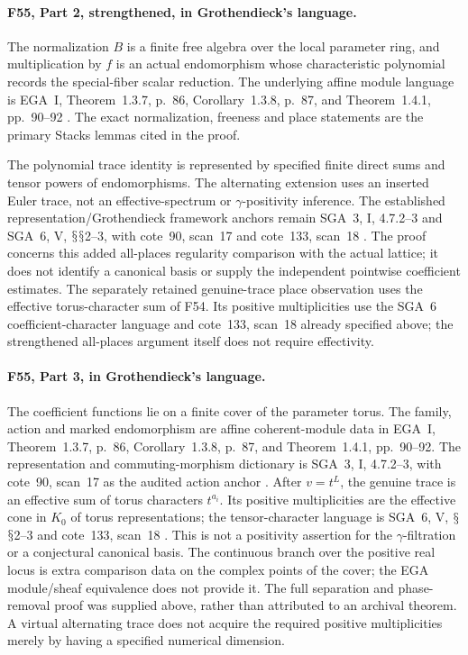 \documentclass[11pt,a4paper]{article}
\renewcommand{\S}{\ensuremath{\mathsection}}
\newcommand{\fid}[1]{\textsf{#1}}\newcommand{\gate}[1]{\textsf{#1}}
\theoremstyle{named}\newtheorem{finding}{Finding}[section]
\theoremstyle{definition}\newtheorem{definition}[finding]{Definition}
\theoremstyle{remark}\newtheorem{remark}[finding]{Remark}
\begin{document}
\paragraph{\fid{F55}, Part 2, strengthened, in Grothendieck's language.}
The normalization $B$ is a finite free algebra over
the local parameter ring, and multiplication by $f$
is an actual endomorphism whose characteristic
polynomial records the special-fiber scalar reduction.
The underlying affine module language is EGA~I,
Theorem~1.3.7, p.~86, Corollary~1.3.8, p.~87,
and Theorem~1.4.1, pp.~90--92 \cite{EGA}.
The exact normalization, freeness and place statements
are the primary Stacks lemmas cited in the proof.

The polynomial trace identity is represented by
specified finite direct sums and tensor powers
of endomorphisms. The alternating extension uses
an inserted Euler trace, not an effective-spectrum
or $\gamma$-positivity inference.
The established representation/Grothendieck framework
anchors remain SGA~3, I, 4.7.2--3 and
SGA~6, V, \S\S2--3, with cote~90, scan~17 and
cote~133, scan~18 \cite{SGA3,SGA6,Archive}.
The proof concerns this added all-places regularity
comparison with the actual lattice; it does not
identify a canonical basis or supply the independent
pointwise coefficient estimates.
The separately retained genuine-trace place observation uses the effective torus-character sum of F54. Its positive multiplicities use the SGA~6 coefficient-character language and cote~133, scan~18 already specified above; the strengthened all-places argument itself does not require effectivity.

\paragraph{\fid{F55}, Part 3, in Grothendieck's language.}
The coefficient functions lie on a finite cover of the
parameter torus. The family, action and marked
endomorphism are affine coherent-module data in
EGA~I, Theorem~1.3.7, p.~86, Corollary~1.3.8, p.~87,
and Theorem~1.4.1, pp.~90--92.
The representation and commuting-morphism dictionary
is SGA~3, I, 4.7.2--3, with cote~90, scan~17 as the
audited action anchor \cite{EGA,SGA3,Archive}.
After $v=t^L$, the genuine trace is an effective sum
of torus characters $t^{a_i}$.
Its positive multiplicities are the effective cone in
$K_0$ of torus representations; the tensor-character
language is SGA~6, V, \S\S2--3 and cote~133, scan~18
\cite{SGA6,Archive}.
This is not a positivity assertion for the
$\gamma$-filtration or a conjectural canonical basis.
The continuous branch over the positive real locus
is extra comparison data on the complex points of
the cover; the EGA module/sheaf equivalence does not
provide it. The full separation and phase-removal
proof was supplied above, rather than attributed to
an archival theorem. A virtual alternating trace
does not acquire the required positive multiplicities
merely by having a specified numerical dimension.
\end{document}
